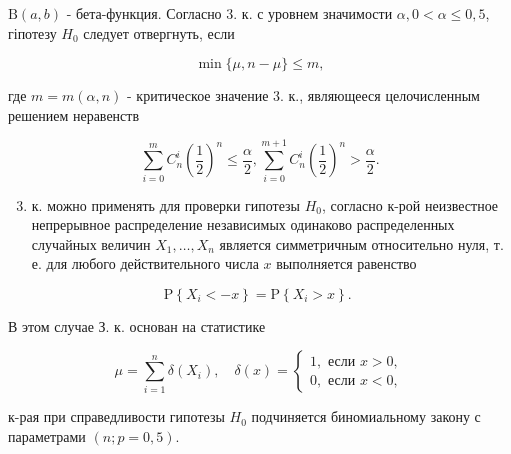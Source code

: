 \documentclass[10pt]{article}
\begin{document}
$\mathrm{B}(a, b)$ - бета-функция. Согласно 3. к. с уровнем значимости $\alpha, 0<\alpha \leqslant 0,5$, гіпотезу $H_{0}$ следует отвергнуть, если



\[

\min \{\mu, n-\mu\} \leqslant m,

\]



где $m=m(\alpha, n)$ - критическое значение 3. к., являющееся целочисленным решением неравенств



\[

\sum_{i=0}^{m} C_{n}^{i}\left(\frac{1}{2}\right)^{n} \leqslant \frac{\alpha}{2}, \sum_{i=0}^{m+1} C_{n}^{i}\left(\frac{1}{2}\right)^{n}>\frac{\alpha}{2} .

\]



\begin{enumerate}

  \setcounter{enumi}{2}

  \item к. можно применять для проверки гипотезы $H_{0}$, согласно к-рой неизвестное непрерывное распределение независимых одинаково распределенных случайных величин $X_{1}, \ldots, X_{n}$ является симметричным относительно нуля, т. е. для любого действительного числа $x$ выполняется равенство

\end{enumerate}



\[

\mathrm{P}\left\{X_{i}<-x\right\}=\mathrm{P}\left\{X_{i}>x\right\} \text {. }

\]



В этом случае З. к. основан на статистике



\[

\mu=\sum_{i=1}^{n} \delta\left(X_{i}\right), \quad \delta(x)=\left\{\begin{array}{l}

1, \text { если } x>0, \\

0, \text { если } x<0,

\end{array}\right.

\]



к-рая при справедливости гипотезы $H_{0}$ подчиняется биномиальному закону с параметрами $(n ; p=0,5)$.
\end{document}
